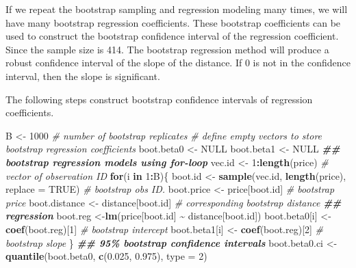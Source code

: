 \documentclass[
]{book}
\newenvironment{Shaded}{\begin{snugshade}}{\end{snugshade}}
\newcommand{\AttributeTok}[1]{\textcolor[rgb]{0.13,0.29,0.53}{#1}}
\newcommand{\CommentTok}[1]{\textcolor[rgb]{0.56,0.35,0.01}{\textit{#1}}}
\newcommand{\ConstantTok}[1]{\textcolor[rgb]{0.56,0.35,0.01}{#1}}
\newcommand{\ControlFlowTok}[1]{\textcolor[rgb]{0.13,0.29,0.53}{\textbf{#1}}}
\newcommand{\DecValTok}[1]{\textcolor[rgb]{0.00,0.00,0.81}{#1}}
\newcommand{\DocumentationTok}[1]{\textcolor[rgb]{0.56,0.35,0.01}{\textbf{\textit{#1}}}}
\newcommand{\FloatTok}[1]{\textcolor[rgb]{0.00,0.00,0.81}{#1}}
\newcommand{\FunctionTok}[1]{\textcolor[rgb]{0.13,0.29,0.53}{\textbf{#1}}}
\newcommand{\NormalTok}[1]{#1}
\newcommand{\OtherTok}[1]{\textcolor[rgb]{0.56,0.35,0.01}{#1}}
\newcommand{\SpecialCharTok}[1]{\textcolor[rgb]{0.81,0.36,0.00}{\textbf{#1}}}
\begin{document}
If we repeat the bootstrap sampling and regression modeling many times, we will have many bootstrap regression coefficients. These bootstrap coefficients can be used to construct the bootstrap confidence interval of the regression coefficient. Since the sample size is 414. The bootstrap regression method will produce a robust confidence interval of the slope of the distance. If 0 is not in the confidence interval, then the slope is significant.

The following steps construct bootstrap confidence intervals of regression coefficients.

\begin{Shaded}
\begin{Highlighting}[]
\NormalTok{B }\OtherTok{\textless{}{-}} \DecValTok{1000}    \CommentTok{\# number of bootstrap replicates}
\CommentTok{\# define empty vectors to store bootstrap regression coefficients}
\NormalTok{boot.beta0 }\OtherTok{\textless{}{-}} \ConstantTok{NULL} 
\NormalTok{boot.beta1 }\OtherTok{\textless{}{-}} \ConstantTok{NULL}
\DocumentationTok{\#\# bootstrap regression models using for{-}loop}
\NormalTok{vec.id }\OtherTok{\textless{}{-}} \DecValTok{1}\SpecialCharTok{:}\FunctionTok{length}\NormalTok{(price)   }\CommentTok{\# vector of observation ID}
\ControlFlowTok{for}\NormalTok{(i }\ControlFlowTok{in} \DecValTok{1}\SpecialCharTok{:}\NormalTok{B)\{}
\NormalTok{  boot.id }\OtherTok{\textless{}{-}} \FunctionTok{sample}\NormalTok{(vec.id, }\FunctionTok{length}\NormalTok{(price), }\AttributeTok{replace =} \ConstantTok{TRUE}\NormalTok{)   }\CommentTok{\# bootstrap obs ID.}
\NormalTok{  boot.price }\OtherTok{\textless{}{-}}\NormalTok{ price[boot.id]           }\CommentTok{\# bootstrap price}
\NormalTok{  boot.distance }\OtherTok{\textless{}{-}}\NormalTok{ distance[boot.id]     }\CommentTok{\# corresponding bootstrap distance}
  \DocumentationTok{\#\# regression}
\NormalTok{  boot.reg }\OtherTok{\textless{}{-}}\FunctionTok{lm}\NormalTok{(price[boot.id] }\SpecialCharTok{\textasciitilde{}}\NormalTok{ distance[boot.id]) }
\NormalTok{  boot.beta0[i] }\OtherTok{\textless{}{-}} \FunctionTok{coef}\NormalTok{(boot.reg)[}\DecValTok{1}\NormalTok{]   }\CommentTok{\# bootstrap intercept}
\NormalTok{  boot.beta1[i] }\OtherTok{\textless{}{-}} \FunctionTok{coef}\NormalTok{(boot.reg)[}\DecValTok{2}\NormalTok{]   }\CommentTok{\# bootstrap slope}
\NormalTok{\}}
\DocumentationTok{\#\#  95\% bootstrap confidence intervals}
\NormalTok{boot.beta0.ci }\OtherTok{\textless{}{-}} \FunctionTok{quantile}\NormalTok{(boot.beta0, }\FunctionTok{c}\NormalTok{(}\FloatTok{0.025}\NormalTok{, }\FloatTok{0.975}\NormalTok{), }\AttributeTok{type =} \DecValTok{2}\NormalTok{)}

\end{Highlighting}
\end{Shaded}
\end{document}
